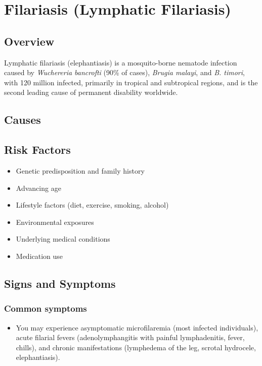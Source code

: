 \chapter{Filariasis (Lymphatic Filariasis)}
\label{sec:Filariasis}

\section{Overview}
Lymphatic filariasis (elephantiasis) is a mosquito-borne nematode infection caused by \textit{Wuchereria bancrofti} (90\% of cases), \textit{Brugia malayi}, and \textit{B. timori}, with 120 million infected, primarily in tropical and subtropical regions, and is the second leading cause of permanent disability worldwide.
\section{Causes}
\section{Risk Factors}

\begin{itemize}[noitemsep]
  \item Genetic predisposition and family history
  \item Advancing age
  \item Lifestyle factors (diet, exercise, smoking, alcohol)
  \item Environmental exposures
  \item Underlying medical conditions
  \item Medication use
\end{itemize}
\section{Signs and Symptoms}

\subsection{Common symptoms}
\begin{itemize}[noitemsep]
  \item You may experience asymptomatic microfilaremia (most infected individuals), acute filarial fevers (adenolymphangitis with painful lymphadenitis, fever, chills), and chronic manifestations (lymphedema of the leg, scrotal hydrocele, elephantiasis). 
  \end{itemize}

